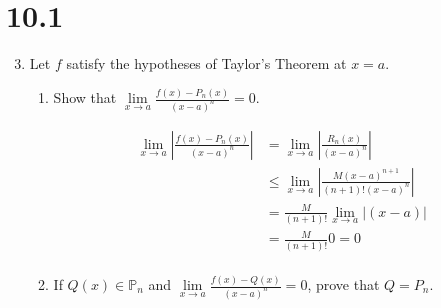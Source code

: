 \documentclass[letterpaper]{article}
\begin{document}
\section*{10.1}
\begin{enumerate}
\setcounter{enumi}{2}
\item
Let $f$ satisfy the hypotheses of Taylor's Theorem at $x=a$.
  \begin{enumerate}
  \item
  Show that $\lim\limits_{x\to a}\frac{f(x)-P_n(x)}{(x-a)^n}=0$.

  \begin{align*}
    \lim\limits_{x\to a}\left\lvert\frac{f(x)-P_n(x)}{(x-a)^n}\right\rvert
    &=\lim\limits_{x\to a}\left\lvert\frac{R_n(x)}{(x-a)^n}\right\rvert\\
    &\le \lim\limits_{x\to a}\left\lvert\frac{M(x-a)^{n+1}}{(n+1)!(x-a)^n}\right\rvert\\
    &= \frac{M}{(n+1)!}\lim\limits_{x\to a}\left\lvert(x-a)\right\rvert\\
    &= \frac{M}{(n+1)!}0=0\\
  \end{align*}
  \item
  If $Q(x)\in \mathbb{P}_n$ and $\lim\limits_{x\to a}\frac{f(x)-Q(x)}{(x-a)^n}=0$, prove that $Q=P_n$.


\end{enumerate}
\end{enumerate}
\end{document}
